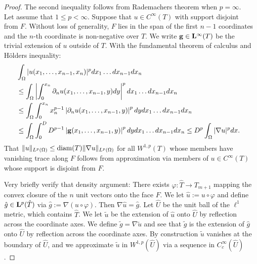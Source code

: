 \documentclass[a4paper]{article}
\begin{document}
\begin{proof}
    The second inequality follows from Rademachers theorem when $p = \infty$.
    Let assume that $1 \leq p < \infty$. 
    Suppose that $u \in C^{\infty}(T)$ with support disjoint from $F$.
    Without loss of generality, $F$ lies in the span of the first $n-1$ coordinates and the $n$-th coordinate is non-negative over $T$. 
    We write ${\mathbf g} \in {\mathbf L}^{\infty}(T)$ be the trivial extension of $u$ outside of $T$.
    With the fundamental theorem of calculus and H\"olders inequality: 
    \begin{align*}
        &
        \int_{\Omega} |u(x_{1},\dots,x_{n-1},x_{n})|^{p} dx_1 \dots dx_{n-1} dx_{n}
        \\&
        \leq
        \int_{\Omega} \left| \int_{0}^{x_n} \partial_{n} u(x_{1},\dots,x_{n-1},y) dy \right|^{p} dx_1 \dots dx_{n-1} dx_{n}
        \\&
        \leq
        \int_{\Omega} \int_{0}^{x_n} x_{n}^{p-1} \left| \partial_{n} u(x_{1},\dots,x_{n-1},y) \right|^{p} dy dx_1 \dots dx_{n-1} dx_{n}
        \\&
        \leq
        \int_{\Omega} \int_{0}^{D} D^{p-1} \left| {\mathbf g}(x_{1},\dots,x_{n-1},y) \right|^{p} dy dx_1 \dots dx_{n-1} dx_{n}
        \leq 
        D^{p} 
        \int_{\Omega} |\nabla u|^{p} dx
        .
    \end{align*}
    That $\|u\|_{L^{p}(\Omega)} \leq {\operatorname{diam}}(T) \|\nabla u\|_{L^{p}(\Omega)}$ for all $W^{1,p}(T)$ whose members have vanishing trace along $F$ follows from approximation via members of $u \in C^{\infty}(T)$ whose support is disjoint from $F$. 
    
    Very briefly verify that density argument: 
    There exists $\varphi : \hat T \rightarrow T_{m+1}$ mapping the convex closure of the $n$ unit vectors onto the face $F$.
    We let $\hat u := u \circ \varphi$ and define $\hat g \in {\mathbf L}^p(\hat T)$ via $\hat g := \nabla ( u \circ \varphi )$. 
    Then $\nabla \hat u = \hat g$. 
    Let $\hat U$ be the unit ball of the $\ell^1$ metric, which contains $\hat T$.
    We let $\tilde u$ be the extension of $\hat u$ onto $\hat U$ by reflection across the coordinate axes.
    We define $\tilde g = \nabla \tilde u$
    and see that $\tilde g$ is the extension of $\hat g$ onto $\hat U$ by reflection across the coordinate axes. 
    By construction $\tilde u$ vanishes at the boundary of $\hat U$,
    and we approximate $\tilde u$ in $W^{1,p}(\hat U)$ via a sequence in $C^{\infty}_{c}(\hat U)$. 
    

\end{proof}
\end{document}
